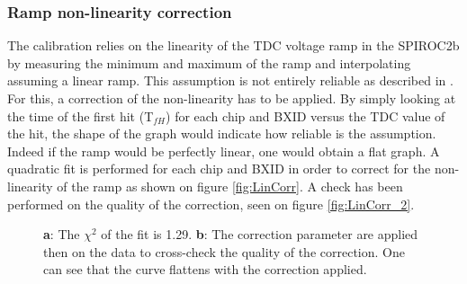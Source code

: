 \documentclass[twoside,a4paper,11pt]{article}
\begin{document}
\subsubsection{Ramp non-linearity correction}
\label{subsec:lin_corr}

The calibration relies on the linearity of the TDC voltage ramp in the SPIROC2b by measuring the minimum and maximum of the ramp and interpolating assuming a linear ramp. This assumption is not entirely reliable as described in \cite{OskarSSP, EldwanSSP}. For this, a correction of the non-linearity has to be applied. By simply looking at the time of the first hit (T$_{fH}$) for each chip and BXID versus the TDC value of the hit, the shape of the graph would indicate how reliable is the assumption. Indeed if the ramp would be perfectly linear, one would obtain a flat graph.
A quadratic fit is performed for each chip and BXID in order to correct for the non-linearity of the ramp as shown on figure \ref{fig:LinCorr}. A check has been performed on the quality of the correction, seen on figure \ref{fig:LinCorr_2}.
\begin{figure}[htbp]
	\hfill
	\caption[]{\textbf{a}: The $\chi^2$ of the fit is 1.29. \textbf{b}: The correction parameter are applied then on the data to cross-check the quality of the correction. One can see that the curve flattens with the correction applied.}
\end{figure}
\end{document}

